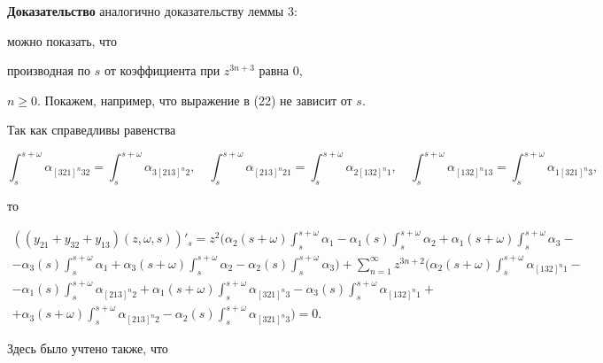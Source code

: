 {\bf Доказательство} аналогично доказательству леммы 3:


можно показать, что


производная по $s$ от коэффициента при $z^{3n+3}$ равна 0,


$n\ge0$. Покажем, например, что выражение в (22) не зависит от $s$.


Так как справедливы равенства


$$


\int_s^{s+\omega}\alpha_{[321]^n32}=\int_s^{s+\omega}\alpha_{3[213]^n2},\quad


\int_s^{s+\omega}\alpha_{[213]^n21}=\int_s^{s+\omega}\alpha_{2[132]^n1},\quad


\int_s^{s+\omega}\alpha_{[132]^n13}=\int_s^{s+\omega}\alpha_{1[321]^n3},


$$


то


\begin{gather*}


((y_{21}+y_{32}+y_{13})(z,\omega,s))'_s=z^2\biggl(\alpha_2(s+\omega)


\int_s^{s+\omega}\alpha_1-\alpha_1(s)\int_s^{s+\omega}\alpha_2+


\alpha_1(s+\omega)\int_s^{s+\omega}\alpha_3-\\


%


-\alpha_3(s)\int_s^{s+\omega}\alpha_1+\alpha_3(s+\omega)\int_s^{s+\omega}


\alpha_2-\alpha_2(s)\int_s^{s+\omega}\alpha_3\biggr)+


\sum_{n=1}^\infty z^{3n+2}\biggl(\alpha_2(s+\omega)\int_s^{s+\omega}


\alpha_{[132]^n1}-\\


%


-\alpha_1(s)\int_s^{s+\omega}\alpha_{[213]^n2}+\alpha_1(s+\omega)


\int_s^{s+\omega}\alpha_{[321]^n3}-\alpha_3(s)\int_s^{s+\omega}


\alpha_{[132]^n1}+\\


%


+\alpha_3(s+\omega)\int_s^{s+\omega}\alpha_{[213]^n2}-\alpha_2(s)


\int_s^{s+\omega}\alpha_{[321]^n3}\biggr)=0.


\end{gather*}


Здесь было учтено также, что


